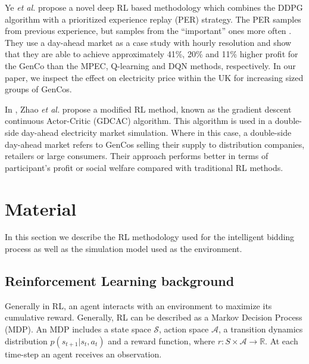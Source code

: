 \documentclass[conference]{IEEEtran}
\begin{document}
Ye \textit{et al.} propose a novel deep RL based methodology which combines the DDPG algorithm with a prioritized experience replay (PER) strategy. The PER samples from previous experience, but samples from the ``important'' ones more often \cite{Schaul2016}. They use a day-ahead market as a case study with hourly resolution and show that they are able to achieve approximately 41\%, 20\% and 11\% higher profit for the GenCo than the MPEC, Q-learning and DQN methods, respectively. In our paper, we inspect the effect on electricity price within the UK for increasing sized groups of GenCos.

In \cite{Zhao2016}, Zhao \textit{et al.} propose a modified RL method, known as the gradient descent continuous Actor-Critic (GDCAC) algorithm. This algorithm is used in a double-side day-ahead electricity market simulation. Where in this case, a double-side day-ahead market refers to GenCos selling their supply to distribution companies, retailers or large consumers. Their approach performs better in terms of participant's profit or social welfare compared with traditional RL methods.





\section{Material}
\label{sec:material}

In this section we describe the RL methodology used for the intelligent bidding process as well as the simulation model used as the environment.

\subsection{Reinforcement Learning background}


Generally in RL, an agent interacts with an environment to maximize its cumulative reward. Generally, RL can be described as a Markov Decision Process (MDP). An MDP includes a state space $\mathcal{S}$, action space $\mathcal{A}$, a transition dynamics distribution $p(s_{t+1}|s_t,a_t)$ and a reward function, where $r:S\times \mathcal{A} \rightarrow \mathbb{R}$. At each time-step an agent receives an observation.
\end{document}
